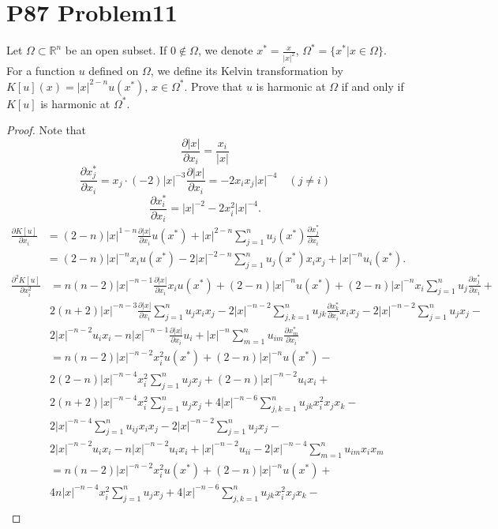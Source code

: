 \documentclass[a4paper]{ctexart}
\begin{document}
\section*{P87 Problem11}
Let $\Omega\subset\mathbb{R}^n$ be an open subset. If $0\notin\Omega$, we denote $x^*=\frac{x}{|x|^2}$, $\Omega^*=\{x^*|x\in\Omega\}$. For a function $u$ defined on $\Omega$, we define its Kelvin transformation by $K[u](x)=|x|^{2-n}u(x^*)$, $x\in\Omega^*$. Prove that $u$ is harmonic at $\Omega$ if and only if $K[u]$ is harmonic at $\Omega^*$.
\begin{proof}
Note that
\[\frac{\partial|x|}{\partial x_i}=\frac{x_i}{|x|}\]
\[\frac{\partial x_j^*}{\partial x_i}=x_j\cdot(-2)|x|^{-3}\frac{\partial|x|}{\partial x_i}=
-2x_ix_j|x|^{-4}\quad(j\neq i)\]
\[\frac{\partial x_i^*}{\partial x_i}=|x|^{-2}-2x^2_i|x|^{-4}.\]
\begin{align*}
\frac{\partial K[u]}{\partial x_i}
&=(2-n)|x|^{1-n}\frac{\partial|x|}{\partial x_i}u(x^*)+
|x|^{2-n}\sum_{j=1}^{n}u_j(x^*)\frac{\partial x_j^*}{\partial x_i}\\
&=(2-n)|x|^{-n}x_iu(x^*)-2|x|^{-2-n}\sum_{j=1}^{n}u_j(x^*)x_ix_j+|x|^{-n}u_i(x^*).
\end{align*}
\begin{align*}
\frac{\partial^2 K[u]}{\partial x_i^2}
&=n(n-2)|x|^{-n-1}\frac{\partial|x|}{\partial x_i}x_iu(x^*)+
(2-n)|x|^{-n}u(x^*)+(2-n)|x|^{-n}x_i\sum_{j=1}^{n}u_j\frac{\partial x_j^*}{\partial x_i}+\\
&2(n+2)|x|^{-n-3}\frac{\partial|x|}{\partial x_i}\sum_{j=1}^{n}u_jx_ix_j-
2|x|^{-n-2}\sum_{j,k=1}^{n}u_{jk}\frac{\partial x_k^*}{\partial x_i}x_ix_j-
2|x|^{-n-2}\sum_{j=1}^{n}u_jx_j-\\
&2|x|^{-n-2}u_ix_i-n|x|^{-n-1}\frac{\partial|x|}{\partial x_i}u_i+|x|^{-n}\sum_{m=1}^{n}u_{im}
\frac{\partial x_m^*}{\partial x_i}\\
&=n(n-2)|x|^{-n-2}x_i^2u(x^*)+(2-n)|x|^{-n}u(x^*)-\\
&2(2-n)|x|^{-n-4}x_i^2\sum_{j=1}^{n}u_jx_j+(2-n)|x|^{-n-2}u_ix_i+\\
&2(n+2)|x|^{-n-4}x_i^2\sum_{j=1}^{n}u_jx_j+4|x|^{-n-6}\sum_{j,k=1}^{n}u_{jk}x_i^2x_jx_k-\\
&2|x|^{-n-4}\sum_{j=1}^{n}u_{ij}x_ix_j-2|x|^{-n-2}\sum_{j=1}^{n}u_jx_j-\\
&2|x|^{-n-2}u_ix_i-n|x|^{-n-2}u_ix_i+|x|^{-n-2}u_{ii}-2|x|^{-n-4}\sum_{m=1}^{n}u_{im}x_ix_m\\
&=n(n-2)|x|^{-n-2}x_i^2u(x^*)+(2-n)|x|^{-n}u(x^*)+\\
&4n|x|^{-n-4}x_i^2\sum_{j=1}^{n}u_jx_j+4|x|^{-n-6}\sum_{j,k=1}^{n}u_{jk}x_i^2x_jx_k-\\

\end{align*}
\end{proof}
\end{document}
